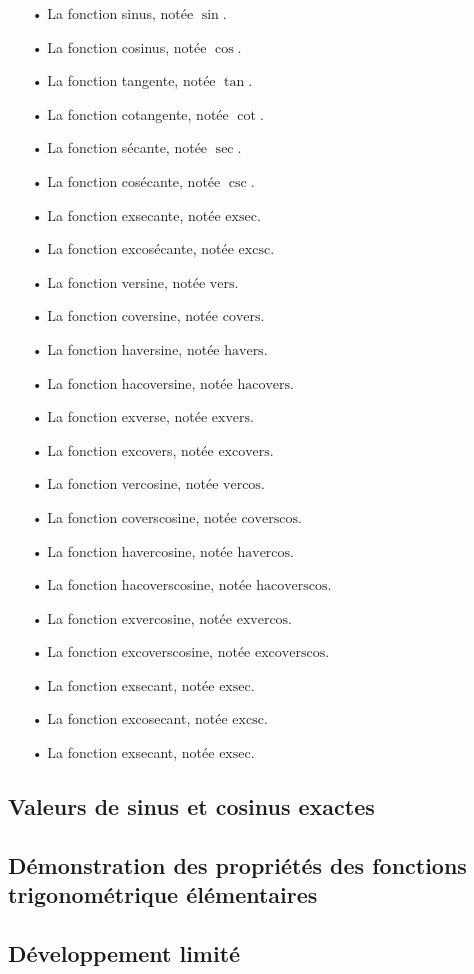 \documentclass[a4paper]{article}
\begin{document}
		\begin{itemize}
				\item [•] La fonction sinus, notée $\sin$.
				\item [•] La fonction cosinus, notée $\cos$.
				\item [•] La fonction tangente, notée $\tan$.
				\item [•] La fonction cotangente, notée $\cot$.
				\item [•] La fonction sécante, notée $\sec$.
				\item [•] La fonction cosécante, notée $\csc$.
				\item [•] La fonction exsecante, notée $\text{exsec}$.
				\item [•] La fonction excosécante, notée $\text{excsc}$.
				\item [•] La fonction versine, notée $\text{vers}$.
				\item [•] La fonction coversine, notée $\text{covers}$.
				\item [•] La fonction haversine, notée $\text{havers}$.
				\item [•] La fonction hacoversine, notée $\text{hacovers}$.
				\item [•] La fonction exverse, notée $\text{exvers}$.
				\item [•] La fonction excovers, notée $\text{excovers}$.
				\item [•] La fonction vercosine, notée $\text{vercos}$.
				\item [•] La fonction coverscosine, notée $\text{coverscos}$.
				\item [•] La fonction havercosine, notée $\text{havercos}$.
				\item [•] La fonction hacoverscosine, notée $\text{hacoverscos}$.
				\item [•] La fonction exvercosine, notée $\text{exvercos}$.
				\item [•] La fonction excoverscosine, notée $\text{excoverscos}$.
				\item [•] La fonction exsecant, notée $\text{exsec}$.
				\item [•] La fonction excosecant, notée $\text{excsc}$.
				\item [•] La fonction exsecant, notée $\text{exsec}$.
			\end{itemize}

		\subsection*{Valeurs de sinus et cosinus exactes} \label{valeur_remarquable_trigo}

		\subsection*{Démonstration des propriétés des fonctions trigonométrique élémentaires} \label{demo_propriete_trigo_1}

		\subsection*{Développement limité} \label{developpement_limite}
\end{document}
